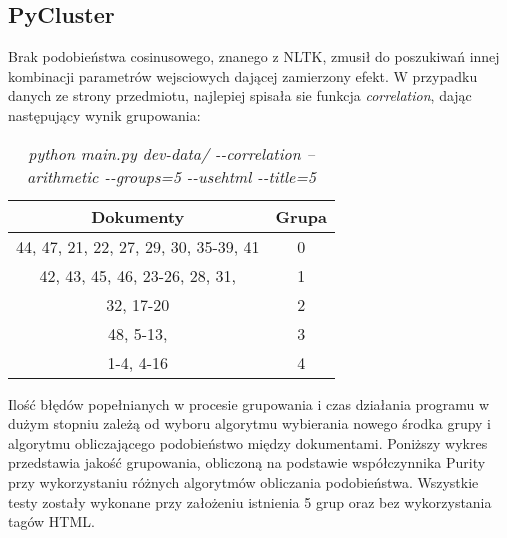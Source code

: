 \documentclass{article}
\begin{document}
\subsection{PyCluster}
Brak podobieństwa cosinusowego, znanego z NLTK, zmusił do poszukiwań innej kombinacji parametrów wejsciowych dającej zamierzony efekt. W przypadku danych ze strony przedmiotu, najlepiej spisała sie funkcja \emph{correlation}, dając następujący wynik grupowania:

\begin{table}[H]
\begin{center}
\begin{tabular}{ | c | c | }
\hline
Dokumenty & Grupa \\ \hline
44, 47, 21, 22, 27, 29, 30, 35-39, 41 & 0 \\ \hline
42, 43, 45, 46, 23-26, 28, 31,  & 1 \\ \hline
32, 17-20 & 2 \\ \hline
48, 5-13,  & 3 \\ \hline
1-4, 4-16 & 4 \\ \hline
\end{tabular}
\caption{\emph{python main.py dev-data/ -{}-correlation --arithmetic -{}-groups=5 -{}-usehtml -{}-title=5}}
\end{center}
\end{table}

Ilość błędów popełnianych w procesie grupowania i czas działania programu w dużym stopniu zależą od wyboru algorytmu wybierania nowego środka grupy i algorytmu obliczającego podobieństwo między dokumentami. Poniższy wykres przedstawia jakość grupowania, obliczoną na podstawie współczynnika Purity przy wykorzystaniu różnych algorytmów obliczania podobieństwa. Wszystkie testy zostały wykonane przy założeniu istnienia 5 grup oraz bez wykorzystania tagów HTML.

\begin{center}
\end{center}
\end{document}
